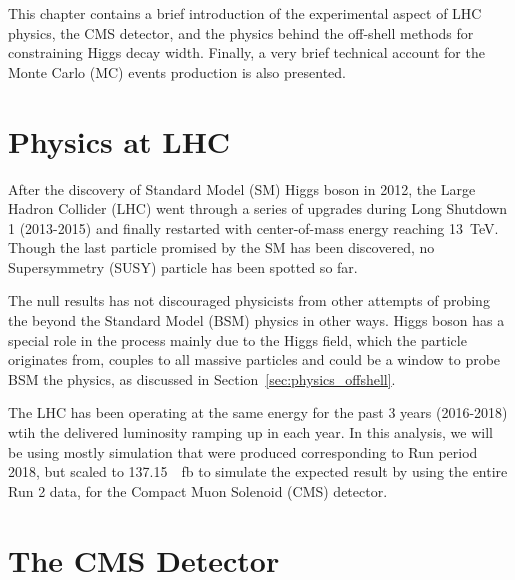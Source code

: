 This chapter contains a brief introduction of the experimental aspect of
LHC physics, the CMS detector, and the physics behind the off-shell methods
for constraining Higgs decay width. Finally, a very brief technical account for
the Monte Carlo (MC) events production is also presented.

\section{Physics at LHC}
After the discovery of Standard Model (SM) Higgs boson in 2012, the Large Hadron Collider (LHC)
went through a series of upgrades during Long Shutdown 1 (2013-2015) and finally restarted with center-of-mass energy reaching
\SI{13}{\tera\electronvolt}. Though the last particle promised by the SM has been discovered,
no Supersymmetry (SUSY) particle has been spotted so far.

The null results has not discouraged physicists from other attempts of probing the 
beyond the Standard Model (BSM) physics in other ways. Higgs boson has a special role in
the process mainly due to the Higgs field, which the particle originates from, couples to all 
massive particles and could be a window to probe BSM the physics, 
as discussed in Section~\ref{sec:physics_offshell}.

The LHC has been operating at the same energy for the past 3 years (2016-2018) wtih 
the delivered luminosity ramping up in each year.\cite{xampl} In this analysis, we will be using
mostly simulation that were produced corresponding to Run period 2018, but scaled to 
\SI{137.15}{\per\femto\barn} to simulate the expected result by using the entire Run 2 data,
for the Compact Muon Solenoid (CMS) detector.\cite{xampl}

\section{The CMS Detector}



